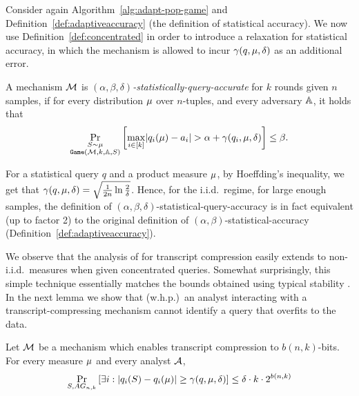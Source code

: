 \documentclass[12pt,a4paper,oneside,onecolumn]{book}
\begin{document}
 Consider again Algorithm~\ref{alg:adapt-pop-game} and Definition~\ref{def:adaptiveaccuracy} (the definition of statistical accuracy). We now use Definition~\ref{def:concentrated} in order to introduce a relaxation for statistical accuracy, in which the mechanism is allowed to incur $\gamma(q,\mu,\delta)$ as an additional error.  
 
 \begin{definition}
  A mechanism $\mathcal{M}$ is {\em $(\alpha,\beta,\delta)$-statistically-query-accurate} for $k$ rounds given $n$ samples, 
  if for every distribution $\mu$ over $n$-tuples, and every adversary $\mathbb{A}$, 
  it holds that 
  \[
    \Pr_{\substack{S\sim\mu\\\texttt{Game}(\mathcal{M},k,\mathbb{A},S)}}\left[
      \max_{i\in [k]} \lvert q_i(\mu) - a_i\rvert > \alpha+\gamma(q_i,\mu,\delta)\right]
      \leq \beta.
  \]
\end{definition}


\begin{remark}
  For a statistical query $q$ and a product measure  $\mu$, by Hoeffding's inequality, we get that 
  $\gamma(q,\mu,\delta) = \sqrt{\frac{1}{2n}\ln\frac{2}{\delta}}$.
  Hence, for the i.i.d.\ regime, for large enough samples, the definition of  $(\alpha,\beta,\delta)$-statistical-query-accuracy is in fact equivalent (up to factor 2) to the original definition of $(\alpha,\beta)$-statistical-accuracy (Definition~\ref{def:adaptiveaccuracy}).
\end{remark}

We observe that the analysis of \citet{dwork2015generalization} for transcript compression easily extends to non-i.i.d.\ measures when given concentrated queries. Somewhat surprisingly, this simple technique essentially matches the bounds obtained using typical stability \citep{DBLP:journals/corr/BassilyF16}.  In the next lemma we show that (w.h.p.)\ an analyst interacting with a transcript-compressing mechanism cannot identify a query that overfits to the data.
 
\begin{lemma}
  \label{lem:compression-gen}
  Let $\mathcal{M}$ be a mechanism which enables
  transcript compression to $b(n,k)$-bits.
  For every measure $\mu$ and every analyst $\mathcal{A}$,
  $$
    \Pr_{S, AG_{n,k}}\left[ \exists i: \lvert q_i(S) - q_i(\mu)\rvert \geq \gamma(q,\mu,\delta) \right]
    \leq \delta \cdot k \cdot 2^{b(n,k)}
  $$
\end{lemma}
\end{document}
